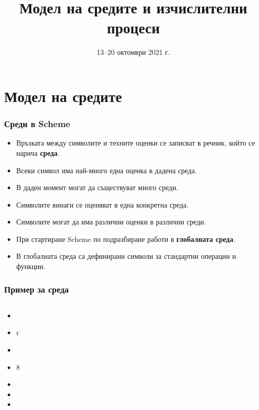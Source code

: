 \documentclass[alsotrans]{beamerswitch}
\title[Среди и процеси]{Модел на средите и изчислителни процеси}
\date{13--20 октомври 2021 г.}
\begin{document}
\begin{frame}
  \titlepage
\end{frame}

\section{Модел на средите}

\begin{frame}
  \frametitle{Среди в Scheme}

  \begin{itemize}[<+->]
  \item Връзката между символите и техните оценки се записват в речник, който се нарича \textbf{среда}.
  \item Всеки символ има най-много една оценка в дадена среда.
  \item В даден момент могат да съществуват много среди.
  \item Символите винаги се оценяват в една конкретна среда.
  \item \alert{Символите могат да има различни оценки в различни среди.}
  \item При стартиране Scheme по подразбиране работи в \textbf{глобалната среда}.
  \item В глобалната среда са дефинирани символи за стандартни операции и функции.
  \end{itemize}
\end{frame}

\begin{frame}
  \frametitle{Пример за среда}

  \begin{columns}[T,onlytextwidth]
    \begin{column}{.5\textwidth}
      \begin{itemize}[<+->]
      \item {}
      \item \evalstoerr r
      \item {}
      \item {}8
      \item {}
      \item {}
      \item {}
      \end{itemize}
    \end{column}

    \begin{column}{.5\textwidth}
    \end{column}
  \end{columns}
\end{frame}
\end{document}
